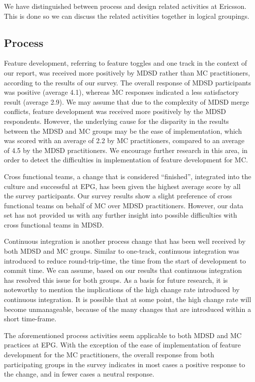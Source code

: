 \documentclass[final_report_innit.tex]{subfiles}
\begin{document}
We have distinguished between process and design related activities at Ericsson. This is done so we can discuss the related activities together in logical groupings.

\subsection*{Process}

Feature development, referring to feature toggles and one track in the context of our report, was received more positively by MDSD rather than MC practitioners, according to the results of our survey. The overall response of MDSD participants was positive (average 4.1), whereas MC responses indicated a less satisfactory result (average 2.9). We may assume that due to the complexity of MDSD merge conflicts, feature development was received more positively by the MDSD respondents. However, the underlying cause for the disparity in the results between the MDSD and MC groups may be the ease of implementation, which was scored with an average of 2.2 by MC practitioners, compared to an average of 4.5 by the MDSD practitioners. We encourage further research in this area, in order to detect the difficulties in implementation of feature development for MC.

Cross functional teams, a change that is considered ``finished'', integrated into the culture and successful at EPG, has been given the highest average score by all the survey participants. Our survey results show a slight preference of cross functional teams on behalf of MC over MDSD practitioners. However, our data set has not provided us with any further insight into possible difficulties with cross functional teams in MDSD. 

Continuous integration is another process change that has been well received by both MDSD and MC groups. Similar to one-track, continuous integration was introduced to reduce round-trip-time, the time from the start of development to commit time. We can assume, based on our results that continuous integration has resolved this issue for both groups. As a basis for future research, it is noteworthy to mention the implications of the high change rate introduced by continuous integration. It is possible that at some point, the high change rate will become unmanageable, because of the many changes that are introduced within a short time-frame.

The aforementioned process activities seem applicable to both MDSD and MC practices at EPG. With the exception of the ease of implementation of feature development for the MC practitioners, the overall response from both participating groups in the survey indicates in most cases a positive response to the change, and in fewer cases a neutral response.
\end{document}
